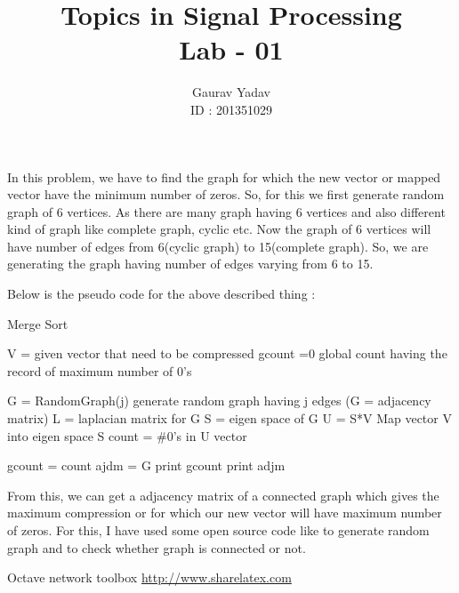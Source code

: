 \documentclass[a4paper,10pt]{article}
\title{Topics in Signal Processing\\Lab - 01}
\author{Gaurav Yadav\\ ID : 201351029}
\begin{document}
\maketitle
In this problem, we have to find the graph for which the new vector or mapped vector have the minimum number of zeros.
So, for this we first generate random graph of 6 vertices. As there are many graph having 6 vertices and also different kind of 
graph like complete graph, cyclic etc. Now the graph of 6 vertices will have number of edges from 6(cyclic graph) to 
15(complete graph). So, we are generating the graph having number of edges varying from 6 to 15.


Below is the pseudo code for the above described thing : 
\begin{algorithm}
   \caption{Merge Sort}
    \begin{algorithmic}[1]
	\State V = given vector that need to be compressed
	\State gcount =0
	\Comment global count having the record of maximum number of 0's
	    
            \State G = RandomGraph(j)
	    \Comment generate random graph having j edges (G = adjacency matrix)
	      \State L = laplacian matrix for G
	      \State S = eigen space of G
	      \State U = S*V
	      \Comment Map vector V into eigen space S
	      \State count = \#0's in U vector
	      
		\State gcount = count
		\State ajdm = G
	      \EndIf
            \EndIf
	  \EndFor  
        \EndFor
        \State print gcount
        \State print adjm
    \end{algorithmic}
\end{algorithm}

From this, we can get a adjacency matrix of a connected graph which gives the maximum compression or for which our new vector
will have maximum number of zeros. 
For this, I have used some open source code like to generate random graph and to check whether graph is connected or not.
\begin{thebibliography}{9}
Octave network toolbox  
\url{http://www.sharelatex.com} 
\end{thebibliography}
\end{document}
